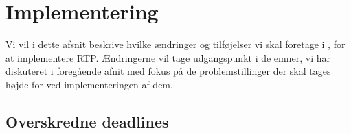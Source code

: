 \section{Implementering}\label{sec:deadline-implementation}
Vi vil i dette afsnit beskrive hvilke ændringer og tilføjelser vi skal foretage i \pycsp, for at implementere RTP. Ændringerne vil tage udgangspunkt i de emner, vi har diskuteret i foregående afnit med fokus på de problemstillinger der skal tages højde for ved implementeringen af dem.  
\subsection{Overskredne deadlines}




